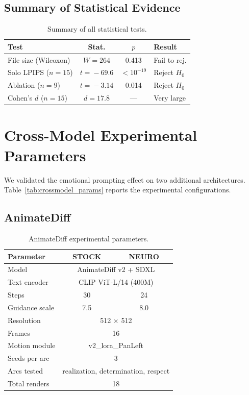 \documentclass[10pt,twocolumn,letterpaper]{article}
\begin{document}
\subsection{Summary of Statistical Evidence}

\begin{table}[h]
\centering
\small
\caption{Summary of all statistical tests.}
\label{tab:stats_summary}
\begin{tabular}{@{}lccl@{}}
\toprule
\textbf{Test} & \textbf{Stat.} & \textbf{$p$} & \textbf{Result} \\
\midrule
File size (Wilcoxon) & $W\!=\!264$ & 0.413 & Fail to rej. \\
Solo LPIPS ($n\!=\!15$) & $t\!=\!{-}69.6$ & $<\!10^{-19}$ & Reject $H_0$ \\
Ablation ($n\!=\!9$) & $t\!=\!{-}3.14$ & 0.014 & Reject $H_0$ \\
Cohen's $d$ ($n\!=\!15$) & $d\!=\!17.8$ & --- & Very large \\
\bottomrule
\end{tabular}
\end{table}

\section{Cross-Model Experimental Parameters}
\label{sec:crossmodel}

We validated the emotional prompting effect on two additional architectures. Table~\ref{tab:crossmodel_params} reports the experimental configurations.

\subsection{AnimateDiff}

\begin{table}[h]
\centering
\small
\caption{AnimateDiff experimental parameters.}
\label{tab:animatediff_params}
\begin{tabular}{lcc}
\toprule
\textbf{Parameter} & \textbf{STOCK} & \textbf{NEURO} \\
\midrule
Model & \multicolumn{2}{c}{AnimateDiff v2 + SDXL} \\
Text encoder & \multicolumn{2}{c}{CLIP ViT-L/14 (400M)} \\
Steps & 30 & 24 \\
Guidance scale & 7.5 & 8.0 \\
Resolution & \multicolumn{2}{c}{512 $\times$ 512} \\
Frames & \multicolumn{2}{c}{16} \\
Motion module & \multicolumn{2}{c}{v2\_lora\_PanLeft} \\
Seeds per arc & \multicolumn{2}{c}{3} \\
Arcs tested & \multicolumn{2}{c}{realization, determination, respect} \\
Total renders & \multicolumn{2}{c}{18} \\
\bottomrule
\end{tabular}
\end{table}
\end{document}
